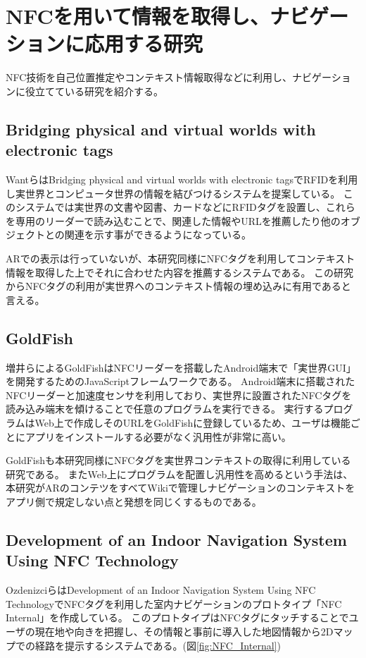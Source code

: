 \section{NFCを用いて情報を取得し、ナビゲーションに応用する研究}
NFC技術を自己位置推定やコンテキスト情報取得などに利用し、ナビゲーションに役立てている研究を紹介する。

\subsection{Bridging physical and virtual worlds with electronic tags}
WantらはBridging physical and virtual worlds with electronic tags\cite{10.1145/302979.303111}でRFIDを利用し実世界とコンピュータ世界の情報を結びつけるシステムを提案している。
このシステムでは実世界の文書や図書、カードなどにRFIDタグを設置し、これらを専用のリーダーで読み込むことで、関連した情報やURLを推薦したり他のオブジェクトとの関連を示す事ができるようになっている。

ARでの表示は行っていないが、本研究同様にNFCタグを利用してコンテキスト情報を取得した上でそれに合わせた内容を推薦するシステムである。
この研究からNFCタグの利用が実世界へのコンテキスト情報の埋め込みに有用であると言える。


\subsection{GoldFish}
増井らによるGoldFish\cite{10.1145/2407696.2407699}はNFCリーダーを搭載したAndroid端末で「実世界GUI」を開発するためのJavaScriptフレームワークである。
Android端末に搭載されたNFCリーダーと加速度センサを利用しており、実世界に設置されたNFCタグを読み込み端末を傾けることで任意のプログラムを実行できる。
実行するプログラムはWeb上で作成しそのURLをGoldFishに登録しているため、ユーザは機能ごとにアプリをインストールする必要がなく汎用性が非常に高い。

GoldFishも本研究同様にNFCタグを実世界コンテキストの取得に利用している研究である。
またWeb上にプログラムを配置し汎用性を高めるという手法は、本研究がARのコンテツをすべてWikiで管理しナビゲーションのコンテキストをアプリ側で規定しない点と発想を同じくするものである。

\subsection{Development of an Indoor Navigation System Using NFC Technology}
OzdenizciらはDevelopment of an Indoor Navigation System Using NFC Technology\cite{5954491}でNFCタグを利用した室内ナビゲーションのプロトタイプ「NFC Internal」を作成している。
このプロトタイプはNFCタグにタッチすることでユーザの現在地や向きを把握し、その情報と事前に導入した地図情報から2Dマップでの経路を提示するシステムである。(図\ref{fig:NFC_Internal})

